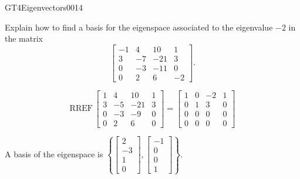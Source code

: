 \begin{exercise}{GT4}{Eigenvectors}{0014} 
\begin{exerciseStatement} 

Explain how to find a basis for the eigenspace associated to the eigenvalue \(-2\) in the matrix \[\left[\begin{array}{cccc}
-1 & 4 & 10 & 1 \\
3 & -7 & -21 & 3 \\
0 & -3 & -11 & 0 \\
0 & 2 & 6 & -2
\end{array}\right].\]

 \end{exerciseStatement}
 \begin{exerciseAnswer} 

\[\mathrm{RREF}\,\left[\begin{array}{cccc}
1 & 4 & 10 & 1 \\
3 & -5 & -21 & 3 \\
0 & -3 & -9 & 0 \\
0 & 2 & 6 & 0
\end{array}\right]=\left[\begin{array}{cccc}
1 & 0 & -2 & 1 \\
0 & 1 & 3 & 0 \\
0 & 0 & 0 & 0 \\
0 & 0 & 0 & 0
\end{array}\right]\]

 

A basis of the eigenspace is \(\left\{ \left[\begin{array}{c}
2 \\
-3 \\
1 \\
0
\end{array}\right] , \left[\begin{array}{c}
-1 \\
0 \\
0 \\
1
\end{array}\right] \right\}\).

 \end{exerciseAnswer}
 \end{exercise}




